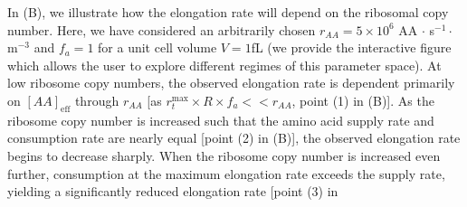 In (B), we illustrate how the elongation rate will
depend on the ribosomal copy number. Here, we have considered an arbitrarily
chosen $r_{AA} = 5\times 10^6$ AA $\cdot$ s$^{-1} \cdot$ \textmu m$^{-3}$ and
$f_a = 1$ for a unit cell volume $V = 1$fL (we provide the interactive figure
 which allows the user to explore
different regimes of this parameter space). At low ribosome copy numbers,
the
observed elongation rate is dependent primarily on $[AA]_\text{eff}$ through
$r_{AA}$ [as $r_t^{\text{max}} \times R \times f_a << r_{AA}$, point (1) in
(B)]. As the ribosome copy number is increased
such that the amino acid supply rate and consumption rate are nearly equal
[point (2) in (B)], the observed elongation rate
begins to decrease sharply. When the ribosome copy number is increased even
further, consumption at the maximum elongation rate exceeds the supply rate,
yielding a significantly reduced elongation rate [point (3) in
